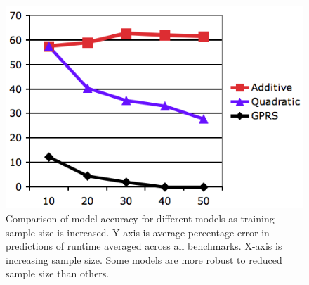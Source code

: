 \begin{figure}
	\centering
	\includegraphics[scale = 0.5] {acc_sample.png} 
	\caption{ \small Comparison of model accuracy for different models as training sample size is increased.  Y-axis is average percentage error in predictions of runtime averaged across all benchmarks. X-axis is increasing sample size.  Some models are more robust to reduced sample size than others.}
	\label{fig:acc-sample}
\end{figure}